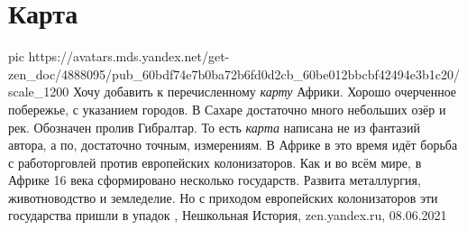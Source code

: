  
 
 
 
 
\chapter{Карта}
\label{sec:slova.karta}

\ifcmt
  pic https://avatars.mds.yandex.net/get-zen_doc/4888095/pub_60bdf74e7b0ba72b6fd0d2cb_60be012bbcbf42494e3b1c20/scale_1200
\fi
Хочу добавить к перечисленному \emph{карту} Африки. Хорошо очерченное
побережье, с указанием городов.  В Сахаре достаточно много небольших озёр и
рек. Обозначен пролив Гибралтар.  То есть \emph{карта} написана не из фантазий
автора, а по, достаточно точным, измерениям.  В Африке в это время идёт борьба
с работорговлей против европейских колонизаторов. Как и во всём мире, в Африке
16 века сформировано несколько государств. Развита металлургия, животноводство
и земледелие.  Но с приходом европейских колонизаторов эти государства пришли в
упадок
, 
Нешкольная История, zen.yandex.ru, 08.06.2021
